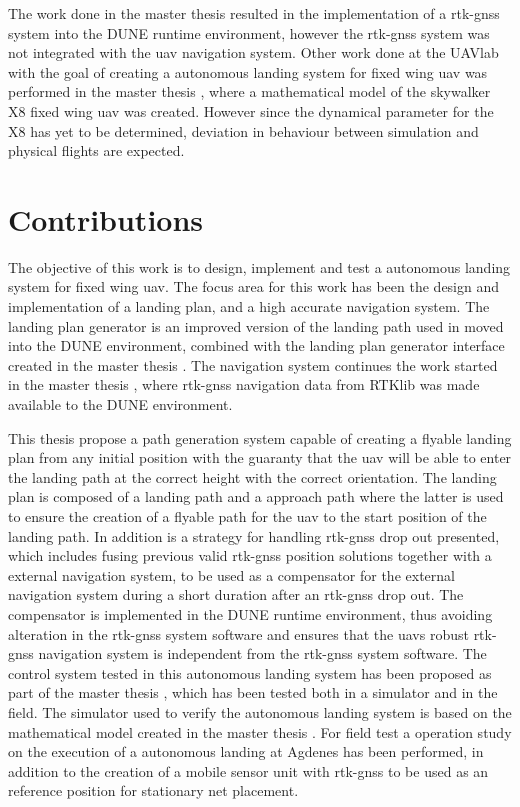 The work done in the master thesis \citep{Spockeli} resulted in the implementation of a \gls{rtk-gnss} system into the DUNE runtime environment, however the \gls{rtk-gnss} system was not integrated with the \gls{uav} navigation system. Other work done at the UAVlab with the goal of creating a autonomous landing system for fixed wing \gls{uav} was performed in the master thesis \citep{Gryte}, where a mathematical model of the skywalker X8 fixed wing \gls{uav} was created. However since the dynamical parameter for the X8 has yet to be determined, deviation in behaviour between simulation and physical flights are expected.
\section{Contributions}
The objective of this work is to design, implement and test a autonomous landing system for fixed wing \gls{uav}. The focus area for this work has been the design and implementation of a landing plan, and a high accurate navigation system. The landing plan generator is an improved version of the landing path used in \citep{Skulstad&Syversen} moved into the DUNE environment, combined with the landing plan generator interface created in the master thesis \citep{Froelich}. The navigation system continues the work started in the master thesis \citep{Spockeli}, where \gls{rtk-gnss} navigation data from RTKlib was made available to the DUNE environment.

This thesis propose a path generation system capable of creating a flyable landing plan from any initial position with the guaranty that the \gls{uav} will be able to enter the landing path at the correct height with the correct orientation. The landing plan is composed of a landing path and a approach path where the latter is used to ensure the creation of a flyable path for the \gls{uav} to the start position of the landing path. In addition is a strategy for handling \gls{rtk-gnss} drop out presented, which includes fusing previous valid \gls{rtk-gnss} position solutions together with a external navigation system, to be used as a compensator for the external navigation system during a short duration after an \gls{rtk-gnss} drop out. The compensator is implemented in the DUNE runtime environment, thus avoiding alteration in the \gls{rtk-gnss} system software and ensures that the \gls{uav}s robust \gls{rtk-gnss} navigation system is independent from the \gls{rtk-gnss} system software. The control system tested in this autonomous landing system has been proposed as part of the master thesis \citep{Sigurd}, which has been tested both in a simulator and in the field. The simulator used to verify the autonomous landing system is based on the mathematical model created in the master thesis \citep{Gryte}. For field test a operation study on the execution of a autonomous landing at Agdenes has been performed, in addition to the creation of a mobile sensor unit with \gls{rtk-gnss} to be used as an reference position for stationary net placement.

